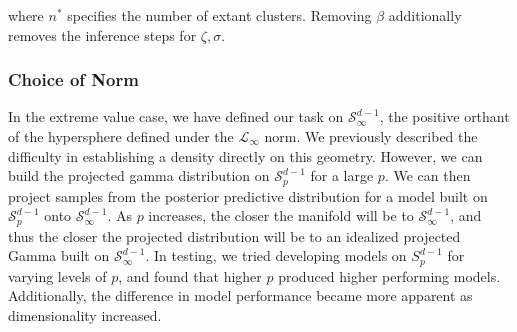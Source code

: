   where $n^*$ specifies the number of extant clusters.  Removing $\beta$ additionally removes the
  inference steps for $\zeta,\sigma$.

\subsubsection{Choice of Norm}
In the extreme value case, we have defined our task on $\mathcal{S}_{\infty}^{d-1}$, the positive orthant
  of the hypersphere defined under the $\mathcal{L}_{\infty}$ norm.  We previously described the 
  difficulty in establishing a density directly on this geometry.  However, we can build the projected gamma distribution on $\mathcal{S}_p^{d-1}$ for a large $p$.  We can then project samples from the posterior predictive distribution for a model built on $\mathcal{S}_p^{d-1}$ onto $\mathcal{S}_{\infty}^{d-1}$.  As $p$ increases, the closer the manifold will be to $\mathcal{S}_{\infty}^{d-1}$, and thus the closer the projected distribution will be to an idealized projected Gamma built on $\mathcal{S}_{\infty}^{d-1}$.  In testing, we tried developing models on $S_p^{d-1}$ for varying levels of $p$, and found that higher $p$ produced higher performing models.  Additionally, the difference in model performance became more apparent as dimensionality increased.

